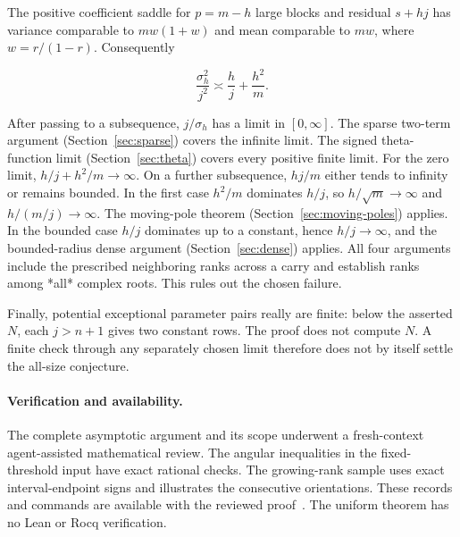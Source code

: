 \documentclass[11pt]{article}
\begin{document}
The positive coefficient saddle for \(p=m-h\) large blocks and residual \(s+hj\) has variance comparable to \(m w(1+w)\) and mean comparable to \(mw\), where \(w=r/(1-r)\). Consequently

\begin{equation*}
\frac{\sigma_h^2}{j^2}\asymp \frac{h}{j}+\frac{h^2}{m}.
\end{equation*}

After passing to a subsequence, \(j/\sigma_h\) has a limit in \([0,\infty]\). The sparse two-term argument (Section~\ref{sec:sparse}) covers the infinite limit. The signed theta-function limit (Section~\ref{sec:theta}) covers every positive finite limit. For the zero limit, \(h/j+h^2/m\to\infty\). On a further subsequence, \(hj/m\) either tends to infinity or remains bounded. In the first case \(h^2/m\) dominates \(h/j\), so \(h/\sqrt m\to\infty\) and \(h/(m/j)\to\infty\). The moving-pole theorem (Section~\ref{sec:moving-poles}) applies. In the bounded case \(h/j\) dominates up to a constant, hence \(h/j\to\infty\), and the bounded-radius dense argument (Section~\ref{sec:dense}) applies. All four arguments include the prescribed neighboring ranks across a carry and establish ranks among *all* complex roots. This rules out the chosen failure.

Finally, potential exceptional parameter pairs really are finite: below the asserted \(N\), each \(j>n+1\) gives two constant rows. The proof does not compute \(N\). A finite check through any separately chosen limit therefore does not by itself settle the all-size conjecture.


\paragraph{Verification and availability.}
The complete asymptotic argument and its scope underwent a fresh-context agent-assisted mathematical review. The angular inequalities in the fixed-threshold input have exact rational checks. The growing-rank sample uses exact interval-endpoint signs and illustrates the consecutive orientations. These records and commands are available with the reviewed proof~\cite{package}. The uniform theorem has no Lean or Rocq verification.
\end{document}
